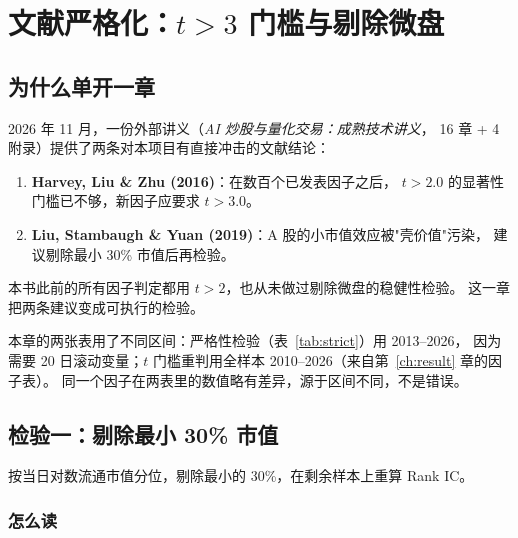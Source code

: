 \chapter{文献严格化：$t>3$ 门槛与剔除微盘}\label{app:strict}

\section{为什么单开一章}

2026 年 11 月，一份外部讲义（\textit{AI 炒股与量化交易：成熟技术讲义}，
16 章 + 4 附录）提供了两条对本项目有直接冲击的文献结论：

\begin{enumerate}
  \item \textbf{Harvey, Liu \& Zhu (2016)}：在数百个已发表因子之后，
        $t>2.0$ 的显著性门槛已不够，新因子应要求 $t>3.0$。
  \item \textbf{Liu, Stambaugh \& Yuan (2019)}：A 股的小市值效应被"壳价值"污染，
        建议剔除最小 30\% 市值后再检验。
\end{enumerate}

本书此前的所有因子判定都用 $t>2$，也从未做过剔除微盘的稳健性检验。
这一章把两条建议变成可执行的检验。

\begin{warnbox}[样本口径说明]
本章的两张表用了不同区间：严格性检验（表~\ref{tab:strict}）用 2013--2026，
因为需要 20 日滚动变量；$t$ 门槛重判用全样本 2010--2026（来自第~\ref{ch:result} 章的因子表）。
同一个因子在两表里的数值略有差异，源于区间不同，不是错误。
\end{warnbox}

\section{检验一：剔除最小 30\% 市值}

按当日对数流通市值分位，剔除最小的 30\%，在剩余样本上重算 Rank IC。

\begin{table}[htbp]
\centering
\caption{全样本 vs 剔除最小 30\% 市值（$h=5$，2013--2026）}
\label{tab:strict}
\small

\end{table}

\subsection{怎么读}

